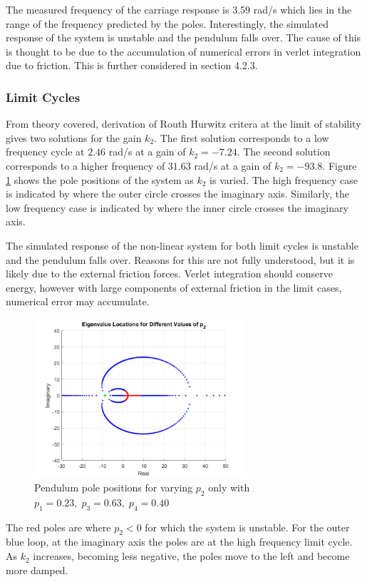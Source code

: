 \documentclass{article}
\begin{document}
The measured frequency of the carriage response is 3.59 rad/s which lies in the range of the frequency predicted by the poles.
Interestingly, the simulated response of the system is unstable and the pendulum falls over.
The cause of this is thought to be due to the accumulation of numerical errors in verlet integration due to friction.
This is further considered in section 4.2.3.

\subsubsection{Limit Cycles}

From theory covered, derivation of Routh Hurwitz critera at the limit of stability gives two solutions for the gain $k_2$.
The first solution corresponds to a low frequency cycle at $2.46$ rad/s at a gain of $k_2 = -7.24$.
The second solution corresponds to a higher frequency of $31.63$ rad/s at a gain of $k_2 = -93.8$.
Figure \ref{fig:roots4.4} shows the pole positions of the system as $k_2$ is varied.
The high frequency case is indicated by where the outer circle crosses the imaginary axis.
Similarly, the low frequency case is indicated by where the inner circle crosses the imaginary axis.

The simulated response of the non-linear system for both limit cycles is unstable and the pendulum falls over.
Reasons for this are not fully understood, but it is likely due to the external friction forces.
Verlet integration should conserve energy, however with large components of external friction in the limit cases, numerical error may accumulate.

\begin{figure}[H]
  \centering
  \includegraphics[width=0.7\textwidth]{figures/4.4roots.jpg}
  \caption{Pendulum pole positions for varying $p_2$ only with $p_1 = 0.23,\;p_3 = 0.63,\;p_4 = 0.40$}
  \label{fig:roots4.4}
\end{figure}
The red poles are where $p_2 < 0$ for which the system is unstable.
For the outer blue loop, at the imaginary axis the poles are at the high frequency limit cycle.
As $k_2$ increases, becoming less negative, the poles move to the left and become more damped.
\end{document}

